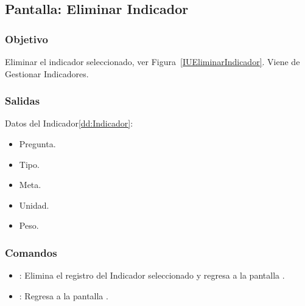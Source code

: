 \subsection{Pantalla: Eliminar Indicador}

\subsubsection{Objetivo}
Eliminar el indicador seleccionado, ver Figura~\ref{IUEliminarIndicador}. Viene de Gestionar Indicadores.


\subsubsection{Salidas}
 Datos del Indicador\ref{dd:Indicador}:
 \begin{itemize}
  \item Pregunta.
  \item Tipo.
  \item Meta.
  \item Unidad.
  \item Peso.
 \end{itemize}

\subsubsection{Comandos}
\begin{itemize}
 \item {}: Elimina el registro del Indicador seleccionado y regresa a la pantalla .
 \item {}: Regresa a la pantalla .
\end{itemize}
